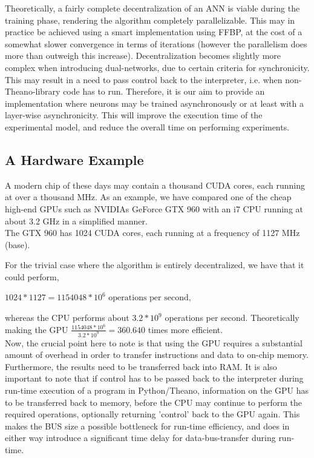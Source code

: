 Theoretically, a fairly complete decentralization of an ANN is viable during the training phase, rendering the algorithm completely parallelizable. This may in practice be achieved using a smart implementation using FFBP, at the cost of a somewhat slower convergence in terms of iterations (however the parallelism does more than outweigh this increase). Decentralization becomes slightly more complex when introducing dual-networks, due to certain criteria for synchronicity. This may result in a need to pass control back to the interpreter, i.e. when non-Theano-library code has to run. Therefore, it is our aim to provide an implementation where neurons may be trained asynchronously or at least with a layer-wise asynchronicity. This will improve the execution time of the experimental model, and reduce the overall time on performing experiments.

\subsection{A Hardware Example}
A modern chip of these days may contain a thousand CUDA cores, each running at over a thousand MHz. As an example, we have compared one of the cheap high-end GPUs such as NVIDIAs GeForce GTX 960 with an i7 CPU running at about 3.2 GHz in a simplified manner.
\\
The GTX 960 has 1024 CUDA cores, each running at a frequency of 1127 MHz (base).

For the trivial case where the algorithm is entirely decentralized, we have that it could perform,

\begin{center}
\begin{math}
    1024 * 1127 = 1 154 048 * 10^6 \text{ operations per second},
\end{math}
\end{center}
whereas the CPU performs about $3.2 * 10^9$ operations per second.
Theoretically making the GPU $\frac{1154048*10^6}{3.2*10^9} = 360.640$ times more efficient.
\\
Now, the crucial point here to note is that using the GPU requires a substantial amount of overhead in order to transfer instructions and data to on-chip memory. Furthermore, the results need to be transferred back into RAM. It is also important to note that if control has to be passed back to the interpreter during run-time execution of a program in Python/Theano, information on the GPU has to be transferred back to memory, before the CPU may continue to perform the required operations, optionally returning 'control' back to the GPU again. This makes the BUS size a possible bottleneck for run-time efficiency, and does in either way introduce a significant time delay for data-bus-transfer during run-time.


